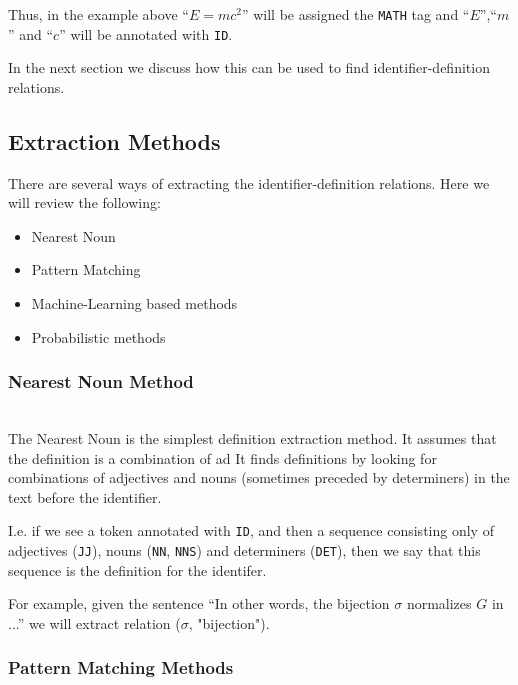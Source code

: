 Thus, in the example above ``$E = mc^2$'' will be assigned the \texttt{MATH} tag
and ``$E$'',``$m$'' and ``$c$'' will be annotated with \texttt{ID}.

In the next section we discuss how this can be used to find identifier-definition 
relations.


\subsection{Extraction Methods} \label{sec:definition-extraction-methods}
There are several ways of extracting the identifier-definition relations.
Here we will review the following:

\begin{itemize}
\itemsep1pt\parskip0pt
  \item Nearest Noun
  \item Pattern Matching
  \item Machine-Learning based methods
  \item Probabilistic methods
\end{itemize}


\subsubsection{Nearest Noun Method}

\ \\

The Nearest Noun  \cite{grigore2009towards} \cite{yokoi2011contextual} 
is the simplest definition extraction method.
It assumes that the definition is a combination of ad
It finds definitions by looking for combinations of adjectives and nouns
(sometimes preceded by determiners) in the text before the identifier. 

I.e. if we see a token annotated with \texttt{ID}, and then a sequence 
consisting only of adjectives (\texttt{JJ}), nouns (\texttt{NN}, \texttt{NNS}) 
and determiners (\texttt{DET}), then we say that this sequence is 
the definition for the identifer. 

For example, given the sentence ``In other words, the bijection $\sigma$ normalizes
$G$ in ...'' we will extract relation ($\sigma$, "bijection").



\subsubsection{Pattern Matching Methods} \label{sec:pattern-matching}

